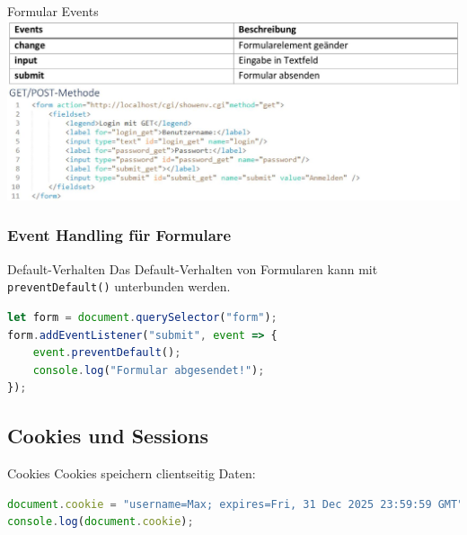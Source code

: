 Formular Events\\
\includegraphics[width=\linewidth]{images/2024_12_29_858f09cde51177c71657g-30}

\subsubsection{Event Handling für Formulare}
\begin{definition}{Default-Verhalten}
Das Default-Verhalten von Formularen kann mit \texttt{preventDefault()} unterbunden werden.
\begin{lstlisting}[language=JavaScript, style=basesmol]
let form = document.querySelector("form");
form.addEventListener("submit", event => {
    event.preventDefault();
    console.log("Formular abgesendet!");
});
\end{lstlisting}
\end{definition}

\subsection{Cookies und Sessions}

\begin{definition}{Cookies}
Cookies speichern clientseitig Daten:
\begin{lstlisting}[language=JavaScript, style=basesmol]
document.cookie = "username=Max; expires=Fri, 31 Dec 2025 23:59:59 GMT";
console.log(document.cookie);
\end{lstlisting}
\end{definition}



